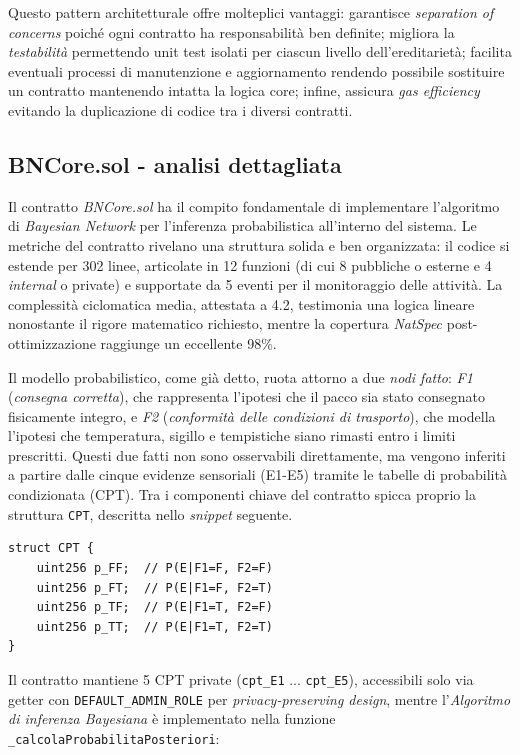 Questo pattern architetturale offre molteplici vantaggi: garantisce \textit{separation of concerns} poiché ogni contratto ha responsabilità ben definite; migliora la \textit{testabilità} permettendo unit test isolati per ciascun livello dell'ereditarietà; facilita eventuali processi di manutenzione e aggiornamento rendendo possibile sostituire un contratto mantenendo intatta la logica core; infine, assicura \textit{gas efficiency} evitando la duplicazione di codice tra i diversi contratti.

\subsection{BNCore.sol - analisi dettagliata}

Il contratto \textit{BNCore.sol} ha il compito fondamentale di implementare l'algoritmo di \textit{Bayesian Network} per l'inferenza probabilistica all'interno del sistema. Le metriche del contratto rivelano una struttura solida e ben organizzata: il codice si estende per 302 linee, articolate in 12 funzioni (di cui 8 pubbliche o esterne e 4 \textit{internal} o private) e supportate da 5 eventi per il monitoraggio delle attività. La complessità ciclomatica media, attestata a 4.2, testimonia una logica lineare nonostante il rigore matematico richiesto, mentre la copertura \textit{NatSpec} post-ottimizzazione raggiunge un eccellente 98\%.

Il modello probabilistico, come già detto, ruota attorno a due \textit{nodi fatto}: \textit{F1} (\textit{consegna corretta}), che rappresenta l'ipotesi che il pacco sia stato consegnato fisicamente integro, e \textit{F2} (\textit{conformità delle condizioni di trasporto}), che modella l'ipotesi che temperatura, sigillo e tempistiche siano rimasti entro i limiti prescritti. Questi due fatti non sono osservabili direttamente, ma vengono inferiti a partire dalle cinque evidenze sensoriali (E1-E5) tramite le tabelle di probabilità condizionata (CPT). Tra i componenti chiave del contratto spicca proprio la struttura \texttt{CPT}, descritta nello \textit{snippet} seguente.

\begin{lstlisting}[language=Solidity, caption={Struttura CPT - Conditional Probability Table}]
struct CPT {
    uint256 p_FF;  // P(E|F1=F, F2=F)
    uint256 p_FT;  // P(E|F1=F, F2=T)
    uint256 p_TF;  // P(E|F1=T, F2=F)
    uint256 p_TT;  // P(E|F1=T, F2=T)
}
\end{lstlisting}

Il contratto mantiene 5 CPT private (\texttt{cpt\_E1} ... \texttt{cpt\_E5}), accessibili solo via getter con \texttt{DEFAULT\_ADMIN\_ROLE} per \textit{privacy-preserving design}, mentre l'\textit{Algoritmo di inferenza Bayesiana} è implementato nella funzione \texttt{\_calcolaProbabilitaPosteriori}:

